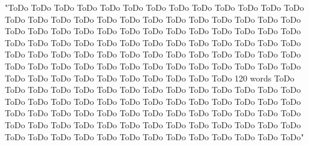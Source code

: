 \documentclass[english, biblatex]{lni}
\begin{document}
"ToDo ToDo ToDo ToDo ToDo ToDo ToDo ToDo ToDo ToDo ToDo ToDo ToDo ToDo ToDo ToDo ToDo ToDo ToDo ToDo ToDo ToDo ToDo ToDo ToDo ToDo ToDo ToDo ToDo ToDo ToDo ToDo ToDo ToDo ToDo ToDo ToDo ToDo ToDo ToDo ToDo ToDo ToDo ToDo ToDo ToDo ToDo ToDo ToDo ToDo ToDo ToDo ToDo ToDo ToDo ToDo ToDo ToDo ToDo ToDo ToDo ToDo ToDo ToDo ToDo ToDo ToDo ToDo ToDo ToDo ToDo ToDo ToDo ToDo ToDo ToDo ToDo ToDo ToDo ToDo ToDo ToDo ToDo ToDo ToDo ToDo ToDo ToDo 120 words ToDo ToDo ToDo ToDo ToDo ToDo ToDo ToDo ToDo ToDo ToDo ToDo ToDo ToDo ToDo ToDo ToDo ToDo ToDo ToDo ToDo ToDo ToDo ToDo ToDo ToDo ToDo ToDo ToDo ToDo ToDo ToDo ToDo ToDo ToDo ToDo ToDo ToDo ToDo ToDo ToDo ToDo ToDo ToDo ToDo ToDo ToDo ToDo ToDo ToDo ToDo ToDo ToDo ToDo ToDo ToDo ToDo ToDo ToDo ToDo ToDo ToDo ToDo ToDo ToDo ToDo"

\printbibliography%
\end{document}
